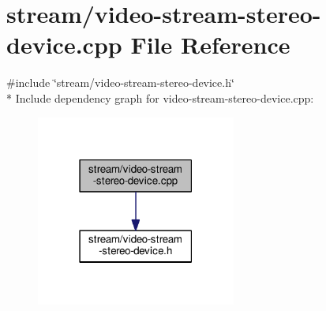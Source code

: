 \hypertarget{video-stream-stereo-device_8cpp}{}\section{stream/video-\/stream-\/stereo-\/device.cpp File Reference}
\label{video-stream-stereo-device_8cpp}
{\ttfamily \#include \char`\"{}stream/video-\/stream-\/stereo-\/device.\+h\char`\"{}}\\*
Include dependency graph for video-\/stream-\/stereo-\/device.cpp\+:
\nopagebreak
\begin{figure}[H]
\begin{center}
\leavevmode
\includegraphics[width=186pt]{video-stream-stereo-device_8cpp__incl}
\end{center}
\end{figure}
